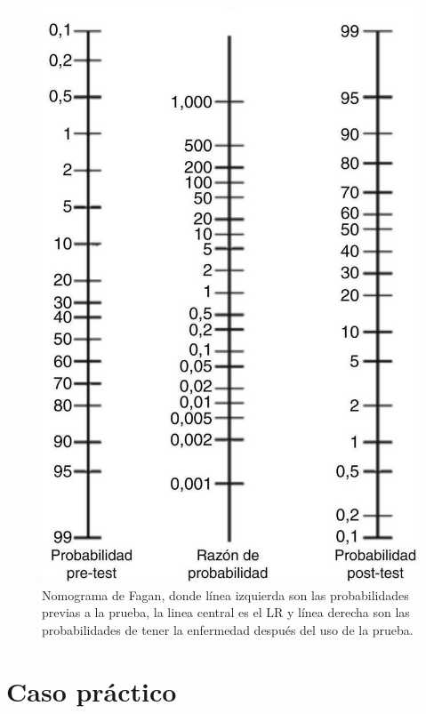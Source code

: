 \documentclass{article}
\begin{document}
\begin{figure}[h]
\centering
\includegraphics[scale=0.28]{Figures/nomograma.jpeg}
\caption{Nomograma de Fagan, donde línea izquierda son las probabilidades previas a la prueba, la linea central es el LR y línea derecha son las probabilidades de tener la enfermedad después del uso de la prueba.}
\label{nomograma}
\end{figure}

\section{Caso práctico}
\end{document}

